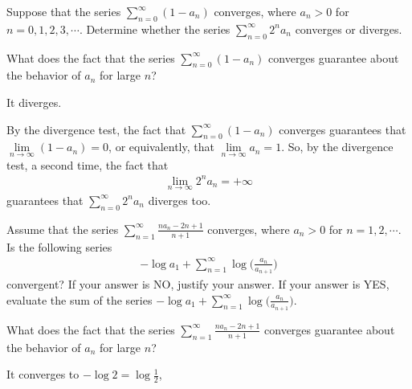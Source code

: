 \begin{Mquestion}[M105 2015A]
Suppose that the series $\sum\limits_{n=0}^{\infty}(1-a_n)$ converges,
where $a_n>0$ for $n=0,1,2,3,\cdots$. Determine whether the series
$\sum\limits_{n=0}^\infty 2^n a_n$ converges or diverges.
\end{Mquestion}

\begin{hint}
What does the fact that the series $\sum\limits_{n=0}^{\infty}(1-a_n)$ converges
guarantee about the behavior of $a_n$ for large $n$?
\end{hint}

\begin{answer}
It diverges.
\end{answer}

\begin{solution}
By the divergence test, the fact that $\sum\limits_{n=0}^{\infty}(1-a_n)$
converges guarantees that $\lim\limits_{n\rightarrow\infty}(1-a_n)=0$,
or equivalently, that $\lim\limits_{n\rightarrow\infty}a_n=1$.  So,
by the divergence test, a second time, the fact that
\begin{align*}
\lim_{n\rightarrow\infty}2^n a_n = +\infty
\end{align*}
guarantees that $\sum\limits_{n=0}^\infty 2^n a_n$ diverges
too.
\end{solution}


\begin{question}[M105 2014A]
Assume that the series
$\displaystyle\sum_{n=1}^\infty\frac{na_n-2n+1}{n+1}$
converges,  where $a_n > 0$ for $n = 1, 2, \cdots$.
Is the following series
\begin{align*}
-\log a_1 + \sum_{n=1}^\infty \log\Big(\frac{a_n}{a_{n+1}}\Big)
\end{align*}
convergent? If your answer is NO, justify your answer.
If your answer is YES, evaluate the sum of the series
$-\log a_1 + \sum\limits_{n=1}^\infty \log\big(\frac{a_n}{a_{n+1}}\big)$.
\end{question}

\begin{hint}
What does the fact that the series
$\displaystyle\sum_{n=1}^\infty\frac{na_n-2n+1}{n+1}$ converges
guarantee about the behavior of $a_n$ for large $n$?
\end{hint}

\begin{answer}
It converges to $-\log 2 =\log\frac{1}{2}$,
\end{answer}

